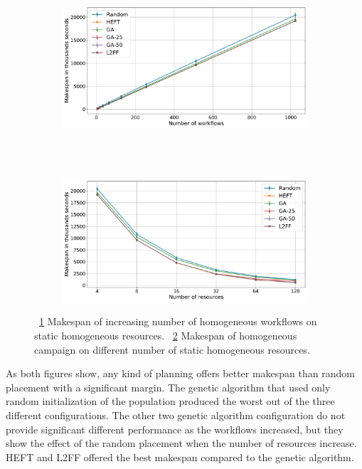 \begin{figure}[ht!]
    \centering
    \begin{subfigure}[b]{0.85\textwidth}
        \includegraphics[width=.95\textwidth]{figures/campaign/StHomoCampaigns_4StHomoResources.pdf}
        \caption{}
        \label{fig:StHomoCampaigns_4StHomoResources}
    \end{subfigure}\\
    ~ 
    \begin{subfigure}[b]{0.85\textwidth}
        \includegraphics[width=.95\textwidth]{figures/campaign/StHomoResources_StHomoCampaigns.pdf}
        \caption{}
        \label{fig:StHomoResources_StHomoCampaigns}
    \end{subfigure}
    \caption{~\ref{fig:StHomoCampaigns_4StHomoResources} Makespan of increasing number of homogeneous workflows on static homogeneous resources.
    ~\ref{fig:StHomoResources_StHomoCampaigns} Makespan of homogeneous campaign on different number of static homogeneous resources.}
    \label{fig:st_homog_analysis}
\end{figure}

As both figures show, any kind of planning offers better makespan than random placement with a significant margin.
The genetic algorithm that used only random initialization of the population produced the worst out of the three different configurations.
The other two genetic algorithm configuration do not provide significant different performance as the workflows increased, but they show the effect of the random placement when the number of resources increase.
HEFT and L2FF offered the best makespan compared to the genetic algorithm.

